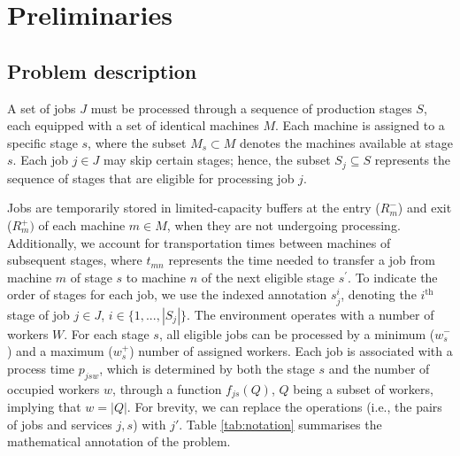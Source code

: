 \documentclass[a4paper,final]{article}
\begin{document}
\section{Preliminaries} \label{sec:prel}
    \subsection{Problem description}
    A set of jobs $J$ must be processed through a sequence of production stages $S$, each equipped with a set of identical machines $M$. Each machine is assigned to a specific stage $s$, where the subset $M_{s}\subset M$ denotes the machines available at stage $s$. Each job $j\in J$ may skip certain stages; hence, the subset $S_{j}\subseteq S$ represents the sequence of stages that are eligible for processing job $j$.
        
        Jobs are temporarily stored in limited-capacity buffers at the entry ($R^{-}_{m}$) and exit ($R^{+}_{m})$ of each machine $m\in M$, when they are not undergoing processing. Additionally, we account for transportation times between machines of subsequent stages, where $t_{mn}$ represents the time needed to transfer a job from machine $m$ of stage $s$ to machine $n$ of the next eligible stage $s^\prime$. To indicate the order of stages for each job, we use the indexed annotation $s^{i}_{j}$, denoting the $i^{\text{th}}$ stage of job $j\in J$, $i\in \{1, ..., |S_{j}|\}$. The environment operates with a number of workers $W$. For each stage $s$, all eligible jobs can be processed by a minimum ($w^{-}_{s}$) and a maximum ($w^{+}_{s}$) number of assigned workers. Each job is associated with a process time $p_{jsw}$, which is determined by both the stage $s$ and the number of occupied workers $w$, through a function $f_{js}(Q)$, $Q$ being a subset of workers, implying that $w = |Q|$. For brevity, we can replace the operations (i.e., the pairs of jobs and services $j, s$) with $j'$. Table \ref{tab:notation} summarises the mathematical annotation of the problem.
\end{document}
